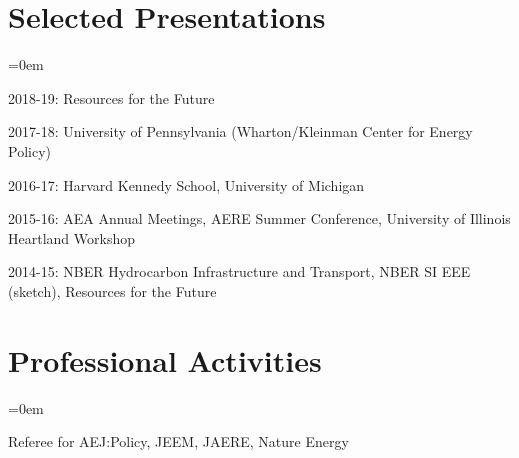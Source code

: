 \documentclass[letterpaper]{article}
\renewenvironment{itemize}{
  \vspace{-0.5em}
  \begin{list}{}{
	\itemsep=0em
    \setlength{\leftmargin}{1.5em}
  }
}{
  \end{list}
}
\begin{document}
\section*{Selected Presentations}
\begin{itemize}
	\item 2018-19: Resources for the Future
	\item 2017-18: University of Pennsylvania (Wharton/Kleinman Center for Energy Policy)
	\item 2016-17: Harvard Kennedy School, University of Michigan
	\item 2015-16: AEA Annual Meetings, AERE Summer Conference, University of Illinois Heartland Workshop
	\item 2014-15: NBER Hydrocarbon Infrastructure and Transport, NBER SI EEE (sketch), Resources for the Future
\end{itemize}

\section*{Professional Activities}
\begin{itemize}
\item Referee for AEJ:Policy, JEEM, JAERE, Nature Energy
\end{itemize}
\end{document}
